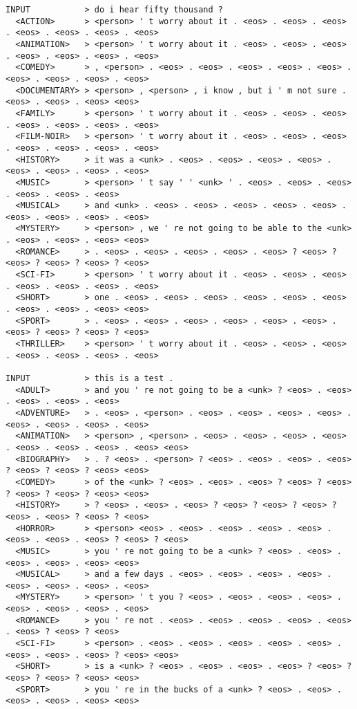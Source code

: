 \begin{scriptsize}
\begin{verbatim}
INPUT           > do i hear fifty thousand ?
  <ACTION>      > <person> ' t worry about it . <eos> . <eos> . <eos> . <eos> . <eos> . <eos> . <eos>
  <ANIMATION>   > <person> ' t worry about it . <eos> . <eos> . <eos> . <eos> . <eos> . <eos> . <eos>
  <COMEDY>      > , <person> . <eos> . <eos> . <eos> . <eos> . <eos> . <eos> . <eos> . <eos> . <eos>
  <DOCUMENTARY> > <person> , <person> , i know , but i ' m not sure . <eos> . <eos> . <eos> <eos>
  <FAMILY>      > <person> ' t worry about it . <eos> . <eos> . <eos> . <eos> . <eos> . <eos> . <eos>
  <FILM-NOIR>   > <person> ' t worry about it . <eos> . <eos> . <eos> . <eos> . <eos> . <eos> . <eos>
  <HISTORY>     > it was a <unk> . <eos> . <eos> . <eos> . <eos> . <eos> . <eos> . <eos> . <eos>
  <MUSIC>       > <person> ' t say ' ' <unk> ' . <eos> . <eos> . <eos> . <eos> . <eos> . <eos>
  <MUSICAL>     > and <unk> . <eos> . <eos> . <eos> . <eos> . <eos> . <eos> . <eos> . <eos> . <eos>
  <MYSTERY>     > <person> , we ' re not going to be able to the <unk> . <eos> . <eos> . <eos> <eos>
  <ROMANCE>     > . <eos> . <eos> . <eos> . <eos> . <eos> ? <eos> ? <eos> ? <eos> ? <eos> ? <eos>
  <SCI-FI>      > <person> ' t worry about it . <eos> . <eos> . <eos> . <eos> . <eos> . <eos> . <eos>
  <SHORT>       > one . <eos> . <eos> . <eos> . <eos> . <eos> . <eos> . <eos> . <eos> . <eos> <eos>
  <SPORT>       > . <eos> . <eos> . <eos> . <eos> . <eos> . <eos> . <eos> ? <eos> ? <eos> ? <eos>
  <THRILLER>    > <person> ' t worry about it . <eos> . <eos> . <eos> . <eos> . <eos> . <eos> . <eos>

INPUT           > this is a test .
  <ADULT>       > and you ' re not going to be a <unk> ? <eos> . <eos> . <eos> . <eos> . <eos>
  <ADVENTURE>   > . <eos> . <person> . <eos> . <eos> . <eos> . <eos> . <eos> . <eos> . <eos> . <eos>
  <ANIMATION>   > <person> , <person> . <eos> . <eos> . <eos> . <eos> . <eos> . <eos> . <eos> . <eos> <eos>
  <BIOGRAPHY>   > . ? <eos> . <person> ? <eos> . <eos> . <eos> . <eos> ? <eos> ? <eos> ? <eos> <eos>
  <COMEDY>      > of the <unk> ? <eos> . <eos> . <eos> ? <eos> ? <eos> ? <eos> ? <eos> ? <eos> <eos>
  <HISTORY>     > ? <eos> . <eos> . <eos> ? <eos> ? <eos> ? <eos> ? <eos> . <eos> ? <eos> ? <eos>
  <HORROR>      > <person> <eos> . <eos> . <eos> . <eos> . <eos> . <eos> . <eos> . <eos> ? <eos> ? <eos>
  <MUSIC>       > you ' re not going to be a <unk> ? <eos> . <eos> . <eos> . <eos> . <eos> <eos>
  <MUSICAL>     > and a few days . <eos> . <eos> . <eos> . <eos> . <eos> . <eos> . <eos> . <eos>
  <MYSTERY>     > <person> ' t you ? <eos> . <eos> . <eos> . <eos> . <eos> . <eos> . <eos> . <eos>
  <ROMANCE>     > you ' re not . <eos> . <eos> . <eos> . <eos> . <eos> . <eos> ? <eos> ? <eos>
  <SCI-FI>      > <person> . <eos> . <eos> . <eos> . <eos> . <eos> . <eos> . <eos> . <eos> ? <eos> <eos>
  <SHORT>       > is a <unk> ? <eos> . <eos> . <eos> . <eos> ? <eos> ? <eos> ? <eos> ? <eos> <eos>
  <SPORT>       > you ' re in the bucks of a <unk> ? <eos> . <eos> . <eos> . <eos> . <eos> <eos>
\end{verbatim}
\end{scriptsize}
